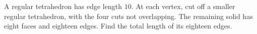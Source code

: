 A regular tetrahedron has edge length $10$. At each vertex, cut off a smaller regular tetrahedron, with the four cuts not overlapping. The remaining solid has eight faces and eighteen edges. Find the total length of its eighteen edges.
